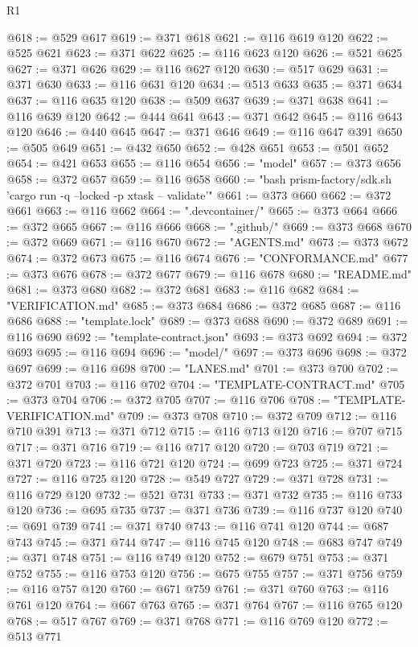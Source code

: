 \begin{lexlean}{R1}
\begin{coremodule}
@618 := @529 @617
@619 := @371 @618
@621 := @116 @619 @120
@622 := @525 @621
@623 := @371 @622
@625 := @116 @623 @120
@626 := @521 @625
@627 := @371 @626
@629 := @116 @627 @120
@630 := @517 @629
@631 := @371 @630
@633 := @116 @631 @120
@634 := @513 @633
@635 := @371 @634
@637 := @116 @635 @120
@638 := @509 @637
@639 := @371 @638
@641 := @116 @639 @120
@642 := @444 @641
@643 := @371 @642
@645 := @116 @643 @120
@646 := @440 @645
@647 := @371 @646
@649 := @116 @647 @391
@650 := @505 @649
@651 := @432 @650
@652 := @428 @651
@653 := @501 @652
@654 := @421 @653
@655 := @116 @654
@656 := "model"
@657 := @373 @656
@658 := @372 @657
@659 := @116 @658
@660 := "bash prism-factory/sdk.sh 'cargo run -q --locked -p xtask -- validate'"
@661 := @373 @660
@662 := @372 @661
@663 := @116 @662
@664 := ".devcontainer/"
@665 := @373 @664
@666 := @372 @665
@667 := @116 @666
@668 := ".github/"
@669 := @373 @668
@670 := @372 @669
@671 := @116 @670
@672 := "AGENTS.md"
@673 := @373 @672
@674 := @372 @673
@675 := @116 @674
@676 := "CONFORMANCE.md"
@677 := @373 @676
@678 := @372 @677
@679 := @116 @678
@680 := "README.md"
@681 := @373 @680
@682 := @372 @681
@683 := @116 @682
@684 := "VERIFICATION.md"
@685 := @373 @684
@686 := @372 @685
@687 := @116 @686
@688 := "template.lock"
@689 := @373 @688
@690 := @372 @689
@691 := @116 @690
@692 := "template-contract.json"
@693 := @373 @692
@694 := @372 @693
@695 := @116 @694
@696 := "model/"
@697 := @373 @696
@698 := @372 @697
@699 := @116 @698
@700 := "LANES.md"
@701 := @373 @700
@702 := @372 @701
@703 := @116 @702
@704 := "TEMPLATE-CONTRACT.md"
@705 := @373 @704
@706 := @372 @705
@707 := @116 @706
@708 := "TEMPLATE-VERIFICATION.md"
@709 := @373 @708
@710 := @372 @709
@712 := @116 @710 @391
@713 := @371 @712
@715 := @116 @713 @120
@716 := @707 @715
@717 := @371 @716
@719 := @116 @717 @120
@720 := @703 @719
@721 := @371 @720
@723 := @116 @721 @120
@724 := @699 @723
@725 := @371 @724
@727 := @116 @725 @120
@728 := @549 @727
@729 := @371 @728
@731 := @116 @729 @120
@732 := @521 @731
@733 := @371 @732
@735 := @116 @733 @120
@736 := @695 @735
@737 := @371 @736
@739 := @116 @737 @120
@740 := @691 @739
@741 := @371 @740
@743 := @116 @741 @120
@744 := @687 @743
@745 := @371 @744
@747 := @116 @745 @120
@748 := @683 @747
@749 := @371 @748
@751 := @116 @749 @120
@752 := @679 @751
@753 := @371 @752
@755 := @116 @753 @120
@756 := @675 @755
@757 := @371 @756
@759 := @116 @757 @120
@760 := @671 @759
@761 := @371 @760
@763 := @116 @761 @120
@764 := @667 @763
@765 := @371 @764
@767 := @116 @765 @120
@768 := @517 @767
@769 := @371 @768
@771 := @116 @769 @120
@772 := @513 @771

\end{coremodule}
\end{lexlean}
